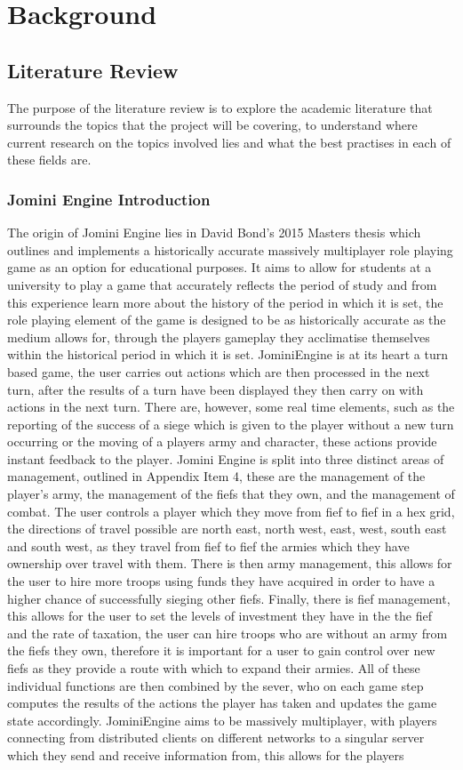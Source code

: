 \documentclass{article}
\begin{document}
	\section{Background}
	\subsection{Literature Review}
	The purpose of the literature review is to explore the academic literature that surrounds the topics that the project will be covering, to understand where current research on the topics involved lies and what the best practises in each of these fields are.
	\subsubsection{Jomini Engine Introduction}
	The origin of Jomini Engine lies in David Bond's 2015 Masters thesis\cite{DavidBond} which outlines and implements a historically accurate massively multiplayer role playing game as an option for educational purposes. It aims to allow for students at a university to play a game that accurately reflects the period of study and from this experience learn more about the history of the period in which it is set, the role playing element of the game is designed to be as historically accurate as the medium allows for,  through the players gameplay they acclimatise themselves within the historical period in which it is set. JominiEngine is at its heart a turn based game, the user carries out actions which are then processed in the next turn, after the results of a turn have been displayed they then carry on with actions in the next turn. There are, however, some real time elements, such as the reporting of the success of a siege which is given to the player without a new turn occurring or the moving of a players army and character, these actions provide instant feedback to the player. Jomini Engine is split into three distinct areas of management, outlined in Appendix Item 4, these are the management of the player's army, the management of the fiefs that they own, and the management of combat. The user controls a player which they move from fief to fief in a hex grid, the directions of travel possible are north east, north west, east, west, south east and south west, as they travel from fief to fief the armies which they have ownership over travel with them. There is then army management, this allows for the user to hire more troops using funds they have acquired in order to have a higher chance of successfully sieging other fiefs. Finally, there is fief management, this allows for the user to set the levels of investment they have in the the fief and the rate of taxation, the user can hire troops who are without an army from the fiefs they own, therefore it is important for a user to gain control over new fiefs as they provide a route with which to expand their armies. All of these individual functions are then combined by the sever, who on each game step computes the results of the actions the player has taken and updates the game state accordingly. JominiEngine aims to be massively multiplayer, with players connecting from distributed clients on different networks to a singular server which they send and receive information from, this allows for the players 
\end{document}
